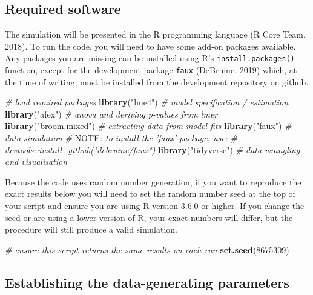 \documentclass[doc,floatsintext]{apa6}
\newenvironment{Shaded}{\begin{snugshade}}{\end{snugshade}}
\newcommand{\AlertTok}[1]{\textcolor[rgb]{0.94,0.16,0.16}{#1}}
\newcommand{\CommentTok}[1]{\textcolor[rgb]{0.56,0.35,0.01}{\textit{#1}}}
\newcommand{\DecValTok}[1]{\textcolor[rgb]{0.00,0.00,0.81}{#1}}
\newcommand{\KeywordTok}[1]{\textcolor[rgb]{0.13,0.29,0.53}{\textbf{#1}}}
\newcommand{\NormalTok}[1]{#1}
\newcommand{\StringTok}[1]{\textcolor[rgb]{0.31,0.60,0.02}{#1}}
\begin{document}
\hypertarget{required-software}{%
\subsection{Required software}\label{required-software}}

The simulation will be presented in the R programming language (R Core Team, 2018). To run the code, you will need to have some add-on packages available. Any packages you are missing can be installed using R's \texttt{install.packages()} function, except for the development package \texttt{faux} (DeBruine, 2019) which, at the time of writing, must be installed from the development repository on github.

\begin{Shaded}
\begin{Highlighting}[]
\CommentTok{# load required packages}
\KeywordTok{library}\NormalTok{(}\StringTok{"lme4"}\NormalTok{)        }\CommentTok{# model specification / estimation}
\KeywordTok{library}\NormalTok{(}\StringTok{"afex"}\NormalTok{)        }\CommentTok{# anova and deriving p-values from lmer}
\KeywordTok{library}\NormalTok{(}\StringTok{"broom.mixed"}\NormalTok{) }\CommentTok{# extracting data from model fits }
\KeywordTok{library}\NormalTok{(}\StringTok{"faux"}\NormalTok{)        }\CommentTok{# data simulation}
\CommentTok{# }\AlertTok{NOTE}\CommentTok{: to install the 'faux' package, use:}
\CommentTok{# devtools::install_github("debruine/faux")}
\KeywordTok{library}\NormalTok{(}\StringTok{"tidyverse"}\NormalTok{)   }\CommentTok{# data wrangling and visualisation}
\end{Highlighting}
\end{Shaded}

Because the code uses random number generation, if you want to reproduce the exact results below you will need to set the random number seed at the top of your script and ensure you are using R version 3.6.0 or higher. If you change the seed or are using a lower version of R, your exact numbers will differ, but the procedure will still produce a valid simulation.

\begin{Shaded}
\begin{Highlighting}[]
\CommentTok{# ensure this script returns the same results on each run}
\KeywordTok{set.seed}\NormalTok{(}\DecValTok{8675309}\NormalTok{)}
\end{Highlighting}
\end{Shaded}

\hypertarget{establishing-the-data-generating-parameters}{%
\subsection{Establishing the data-generating parameters}\label{establishing-the-data-generating-parameters}}
\end{document}
